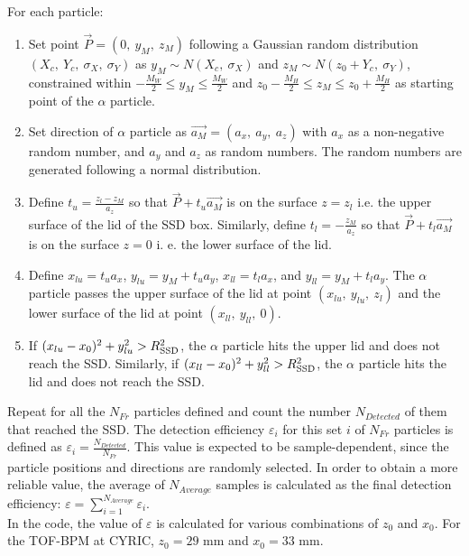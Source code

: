 \documentclass{article}
\begin{document}
For each particle:
\begin{enumerate}
	\item Set point $\vec{P} = (0,\ y_M,\ z_M)$ following a Gaussian random distribution $(X_c,\ Y_c,\ \sigma_X,\ \sigma_Y)$ as $y_M \sim N(X_c,\ \sigma_X)$ and $z_M \sim N(z_0+Y_c,\ \sigma_Y)$, constrained within $-\frac{M_W}{2} \le y_M \le \frac{M_W}{2}$ and $z_0-\frac{M_H}{2} \le z_M \le z_0+\frac{M_H}{2}$ as starting point of the $\alpha$ particle.
	\item Set direction of $\alpha$ particle as $\vec{a_M} = (a_x,\ a_y,\ a_z)$ with $a_x$ as a non-negative random number, and $a_y$ and $a_z$ as random numbers. The random numbers are generated following a normal distribution.
	\item Define $t_u = \frac{z_l - z_M}{a_z}$ so that $\vec{P} + t_u \vec{a_M}$ is on the surface $z = z_l$ i.e. the upper surface of the lid of the SSD box. Similarly, define $t_l = -\frac{z_M}{a_z}$ so that $\vec{P} + t_l \vec{a_M}$ is on the surface $z = 0$ i. e. the lower surface of the lid.
	\item Define $x_{lu} = t_u a_x$, $y_{lu} = y_M + t_u a_y$, $x_{ll} = t_l a_x$, and $y_{ll} = y_M + t_l a_y$. The $\alpha$ particle passes the upper surface of the lid at point $(x_{lu},\ y_{lu},\ z_l)$ and the lower surface of the lid at point $(x_{ll},\ y_{ll},\ 0)$. 
	\item If $(x_{lu} - x_0)^2 + y_{lu}^2 > R_{{\rm SSD}}^2$, the $\alpha$ particle hits the upper lid and does not reach the SSD. Similarly, if $(x_{ll} - x_0)^2 + y_{ll}^2 > R_{{\rm SSD}}^2$, the $\alpha$ particle hits the lid and does not reach the SSD.
\end{enumerate}
Repeat for all the $N_{Fr}$ particles defined and count the number $N_{Detected}$ of them that reached the SSD. The detection efficiency $\varepsilon_i$ for this set $i$ of $N_{Fr}$ particles is defined as $\varepsilon_i = \frac{N_{Detected}}{N_{Fr}}$. This value is expected to be sample-dependent, since the particle positions and directions are randomly selected. In order to obtain a more reliable value, the average of $N_{Average}$ samples is calculated as the final detection efficiency: $\varepsilon = \sum_{i=1}^{N_{Average}} \varepsilon_i$. \\

In the code, the value of $\varepsilon$ is calculated for various combinations of $z_0$ and $x_0$. For the TOF-BPM at CYRIC, $z_0 = 29$ mm and $x_0 = 33$ mm.
\end{document}
